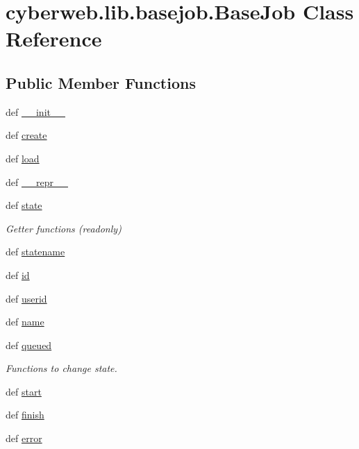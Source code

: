 \hypertarget{classcyberweb_1_1lib_1_1basejob_1_1_base_job}{\section{cyberweb.\-lib.\-basejob.\-Base\-Job \-Class \-Reference}
\label{classcyberweb_1_1lib_1_1basejob_1_1_base_job}
}
\subsection*{\-Public \-Member \-Functions}
\begin{DoxyCompactItemize}
\item 
def \hyperlink{classcyberweb_1_1lib_1_1basejob_1_1_base_job_ab4ea7813fe109b5c0d7916b2c4644299}{\-\_\-\-\_\-init\-\_\-\-\_\-}
\item 
def \hyperlink{classcyberweb_1_1lib_1_1basejob_1_1_base_job_a141db7357861a0c571df92434c785b6e}{create}
\item 
def \hyperlink{classcyberweb_1_1lib_1_1basejob_1_1_base_job_a3d68880059a34ba5c2fee3728cc5db3a}{load}
\item 
def \hyperlink{classcyberweb_1_1lib_1_1basejob_1_1_base_job_a550825641ea3e741322f1a9972dc1c94}{\-\_\-\-\_\-repr\-\_\-\-\_\-}
\item 
def \hyperlink{classcyberweb_1_1lib_1_1basejob_1_1_base_job_a2d5cab005f8123f520b8697e994783a1}{state}
\begin{DoxyCompactList}\small\item\em \-Getter functions (readonly) \end{DoxyCompactList}\item 
def \hyperlink{classcyberweb_1_1lib_1_1basejob_1_1_base_job_aa970dd703766f0edda292fc01b7c61b2}{statename}
\item 
def \hyperlink{classcyberweb_1_1lib_1_1basejob_1_1_base_job_afc83bc2e7770987f1553aeec71f20e28}{id}
\item 
def \hyperlink{classcyberweb_1_1lib_1_1basejob_1_1_base_job_a567fd2eb956e7fd8375742a9386e8067}{userid}
\item 
def \hyperlink{classcyberweb_1_1lib_1_1basejob_1_1_base_job_ab7cf13a8852ec43970e2c6f616845872}{name}
\item 
def \hyperlink{classcyberweb_1_1lib_1_1basejob_1_1_base_job_adaf6d55ff24a9cecb2e3b561d86ea41f}{queued}
\begin{DoxyCompactList}\small\item\em \-Functions to change state. \end{DoxyCompactList}\item 
def \hyperlink{classcyberweb_1_1lib_1_1basejob_1_1_base_job_a804ea9b69922cae2eaae03f0fda4bf2d}{start}
\item 
def \hyperlink{classcyberweb_1_1lib_1_1basejob_1_1_base_job_a507f2c585491d46fd703beedcc744efd}{finish}
\item 
def \hyperlink{classcyberweb_1_1lib_1_1basejob_1_1_base_job_a65198ddd78d5f497c9fa4056348664f3}{error}
\end{DoxyCompactItemize}


